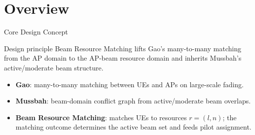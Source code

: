 \documentclass[10pt,aspectratio=169]{beamer}
\newcommand{\BRM}{Beam Resource Matching}
\newenvironment{tightitemize}{%
    \begin{itemize}
        \setlength{\itemsep}{2pt}
        \setlength{\parskip}{0pt}
        \setlength{\parsep}{0pt}
}{%
    \end{itemize}
}
\begin{document}
\section{Overview}

\begin{frame}{Core Design Concept}
    \small
    \begin{block}{Design principle}
        \BRM{} lifts Gao's many-to-many matching from the AP domain to the AP-beam
        resource domain and inherits Mussbah's active/moderate beam structure.
    \end{block}
    
    \vspace{0.5em}
    \begin{center}
    \end{center}
    
    \vspace{0.3em}
    \begin{tightitemize}
        \item \textbf{Gao}: many-to-many matching between UEs and APs on large-scale fading.
        \item \textbf{Mussbah}: beam-domain conflict graph from active/moderate beam overlaps.
        \item \textbf{\BRM{}}: matches UEs to resources \(r=(l,n)\); the matching outcome determines the active beam set and feeds pilot assignment.
    \end{tightitemize}
\end{frame}

\end{document}
